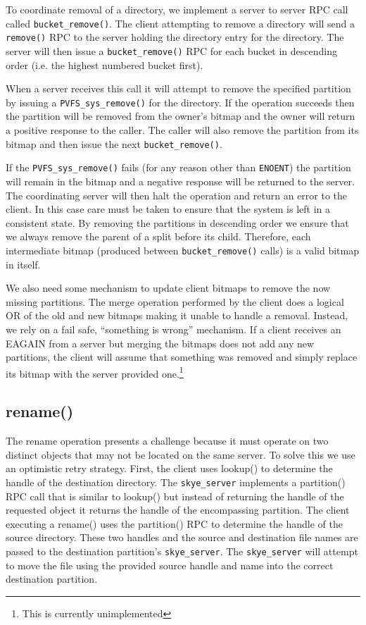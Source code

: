 \documentclass[letterpaper]{article}
\newcommand{\code}[1]{\texttt{#1}}
\begin{document}
To coordinate removal of a directory, we implement a server to server RPC call
called \code{bucket\_\-remove()}.  The client attempting to remove a directory will send a
\code{remove()} RPC to the server holding the directory entry for the directory.  The
server will then issue a \code{bucket\_\-remove()} RPC for each bucket in descending order
(i.e. the highest numbered bucket first).  

When a server receives this call it will attempt to remove the specified
partition by issuing a \code{PVFS\_\-sys\_\-remove()} for the directory.  If the operation
succeeds then the partition will be removed from the owner's bitmap and the
owner will return a positive response to the caller.  The caller will also
remove the partition from its bitmap and then issue the next
\code{bucket\_\-remove()}.

If the \code{PVFS\_\-sys\_\-remove()} fails (for any reason other than \code{ENOENT}) the partition
will remain in the bitmap and a negative response will be returned to the
server.  The coordinating server will then halt the operation and return an
error to the client.  In this case care must be taken to ensure that the system
is left in a consistent state.  By removing the partitions in descending order
we ensure that we always remove the parent of a split before its child.
Therefore, each intermediate bitmap (produced between
\code{bucket\_\-remove()} calls) is
a valid bitmap in itself.

We also need some mechanism to update client bitmaps to remove the now missing
partitions.  The merge operation performed by the client does a logical
OR of the old and new bitmaps making it unable to handle a removal.  Instead, we
rely on a fail safe, ``something is wrong'' mechanism.  If a client receives an
EAGAIN from a server but merging the bitmaps does not add any new partitions,
the client will assume that something was removed and simply replace its bitmap
with the server provided one.\footnote{This is currently unimplemented}

\subsection{rename()}
The rename operation presents a challenge because it must operate on two distinct
objects that may not be located on the same server.  To solve this we use an
optimistic retry strategy.  First, the client uses lookup() to determine the
handle of the destination directory.  The \code{skye\_\-server} implements a partition()
RPC call that is similar to lookup() but instead of returning the handle of the
requested object it returns the handle of the encompassing partition.  The
client executing a rename() uses the partition() RPC to determine the handle of
the source directory.  These two handles and the source and destination file
names are passed to the destination partition's \code{skye\_\-server}.  The \code{skye\_\-server}
will attempt to move the file using the provided source handle and name into the
correct destination partition.  
\end{document}
